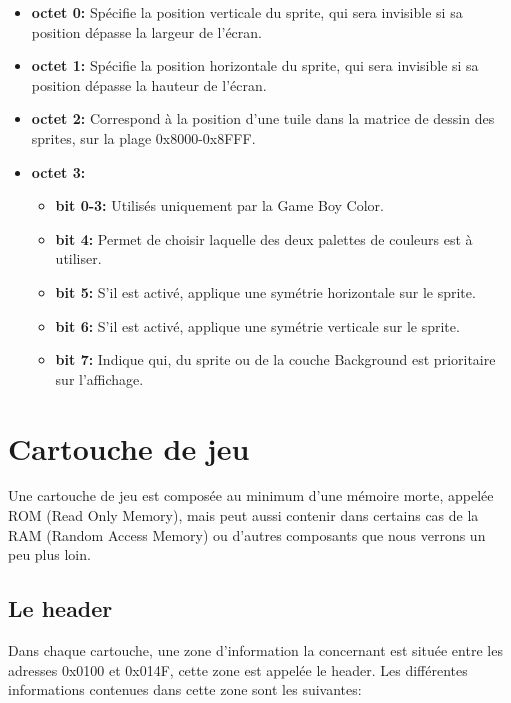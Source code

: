 \documentclass{report}
\begin{document}
\begin{itemize}
\item \textbf{octet 0:}
	Spécifie la position verticale du sprite, qui sera invisible si sa position dépasse la largeur de l'écran.\\
\item \textbf{octet 1:}
	Spécifie la position horizontale du sprite, qui sera invisible si sa position dépasse la hauteur de l'écran.\\
\item \textbf{octet 2:}
	Correspond à la position d'une tuile dans la matrice de dessin des sprites, sur la plage 0x8000-0x8FFF.\\
\item \textbf{octet 3:}
	\begin{itemize}
	\item \textbf{bit 0-3:}
		Utilisés uniquement par la Game Boy Color.\\
	\item \textbf{bit 4:}
		Permet de choisir laquelle des deux palettes de couleurs est à utiliser.\\
	\item \textbf{bit 5:}
		S'il est activé, applique une symétrie horizontale sur le sprite.\\
	\item \textbf{bit 6:}
		S'il est activé, applique une symétrie verticale sur le sprite.\\
	\item \textbf{bit 7:}
		Indique qui, du sprite ou de la couche Background est prioritaire sur l'affichage. \\
	\end{itemize}
	
\end{itemize}


\section{Cartouche de jeu}
Une cartouche de jeu est composée au minimum d'une mémoire morte, appelée ROM (Read Only Memory), mais peut aussi contenir dans certains cas de la RAM (Random Access Memory) ou d'autres composants que nous verrons un peu plus loin.

\subsection{Le header}
Dans chaque cartouche, une zone d'information la concernant est située entre les adresses 0x0100 et 0x014F, cette zone est appelée le header. Les différentes informations contenues dans cette zone sont les suivantes:\\
\end{document}
